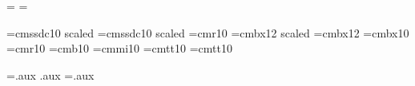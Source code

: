 



\newtoks\header
\header={ }
\newtoks\footer
\footer={ }

\def\forceodd{\ifodd\pageno\else\null\vfill\eject\fi}
\def\forceeven{\ifodd\pageno\null\vfill\eject\fi}

\def\ifundefined#1{\expandafter\ifx\csname#1\endcsname\relax}
\def\paramone#1#2{#1}
\def\firstparam#1{\expandafter\paramone #1}
\def\paramtwo#1#2{#2}
\def\secondparam#1{\expandafter\paramtwo #1}

\def\finalout{\overfullrule=0pt}

\def\raggedleft{\leftskip=0pt plus \hsize
\parfillskip=0pt\spaceskip=.3333em\xspaceskip=.5em}

\def\raggedboth{\leftskip=0pt plus 10in \rightskip=0pt plus 10in\parfillskip=0pt}

\font\titlefont=cmssdc10 scaled
\font\subtitlefont=cmssdc10 scaled
\font\textfont=cmr10
\font\chapterfont=cmbx12 scaled
\font\tocchapterfont=cmbx12
\font\sectionfont=cmbx10
\font\ssectionfont=cmr10
\font\bold=cmb10
\font\italic=cmmi10
\font\typewriter=cmtt10
\font\tw=cmtt10





\newread\aux
\immediate\openin\aux=\jobname.aux
\ifeof\aux {}
\else  \jobname.aux \immediate\closein\aux \fi
\newwrite\aux
\immediate\openout\aux=\jobname.aux

